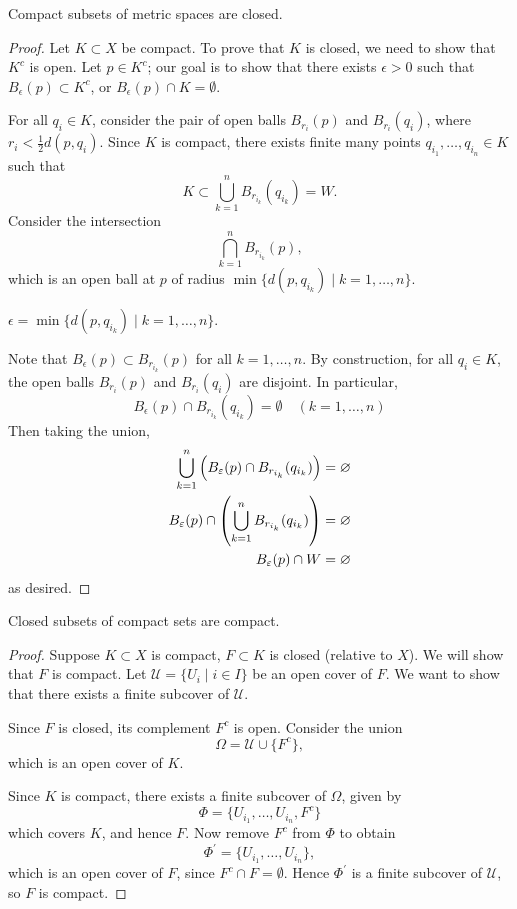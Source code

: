 \begin{proposition}\label{prop:compact-closed}
Compact subsets of metric spaces are closed.
\end{proposition}

\begin{proof}
Let $K\subset X$ be compact. To prove that $K$ is closed, we need to show that $K^c$ is open. Let $p\in K^c$; our goal is to show that there exists $\epsilon>0$ such that $B_\epsilon(p)\subset K^c$, or $B_\epsilon(p)\cap K=\emptyset$.

For all $q_i\in K$, consider the pair of open balls $B_{r_i}(p)$ and $B_{r_i}(q_i)$, where $r_i<\frac{1}{2}d(p,q_i)$. Since $K$ is compact, there exists finite many points $q_{i_1},\dots,q_{i_n}\in K$ such that
\[K\subset\bigcup_{k=1}^{n}B_{r_{i_k}}(q_{i_k})=W.\]
Consider the intersection
\[\bigcap_{k=1}^{n}B_{r_{i_k}}(p),\]
which is an open ball at $p$ of radius $\min\{d(p,q_{i_k})\mid k=1,\dots,n\}$. 
\begin{claim}
$\epsilon=\min\{d(p,q_{i_k})\mid k=1,\dots,n\}$.
\end{claim}
Note that $B_\epsilon(p)\subset B_{r_{i_k}}(p)$ for all $k=1,\dots,n$. By construction, for all $q_i\in K$, the open balls $B_{r_i}(p)$ and $B_{r_i}(q_i)$ are disjoint. In particular,
\[B_\epsilon(p)\cap B_{r_{i_k}}(q_{i_k})=\emptyset\quad(k=1,\dots,n)\]
Then taking the union,
\begin{align*}
\bigcup_{k=1}^{n}\left(B_\varepsilon(p)\cap B_{r_{i_k}}(q_{i_k})\right)&=\varnothing\\
B_\varepsilon(p)\cap\left(\bigcup_{k=1}^{n}B_{r_{i_k}}(q_{i_k})\right)&=\varnothing\\
B_\varepsilon(p)\cap W&=\varnothing
\end{align*}
as desired.
\end{proof}

\begin{proposition}\label{prop:closed-compact}
Closed subsets of compact sets are compact.
\end{proposition}

\begin{proof}
Suppose $K\subset X$ is compact, $F\subset K$ is closed (relative to $X$). We will show that $F$ is compact. Let $\mathcal{U}=\{U_i\mid i\in I\}$ be an open cover of $F$. We want to show that there exists a finite subcover of $\mathcal{U}$.

Since $F$ is closed, its complement $F^c$ is open. Consider the union
\[\Omega=\mathcal{U}\cup\{F^c\},\]
which is an open cover of $K$.

Since $K$ is compact, there exists a finite subcover of $\Omega$, given by
\[\Phi=\{U_{i_1},\dots,U_{i_n},F^c\}\]
which covers $K$, and hence $F$. Now remove $F^c$ from $\Phi$ to obtain
\[\Phi^\prime=\{U_{i_1},\dots,U_{i_n}\},\]
which is an open cover of $F$, since $F^c\cap F=\emptyset$. Hence $\Phi^\prime$ is a finite subcover of $\mathcal{U}$, so $F$ is compact.
\end{proof}

